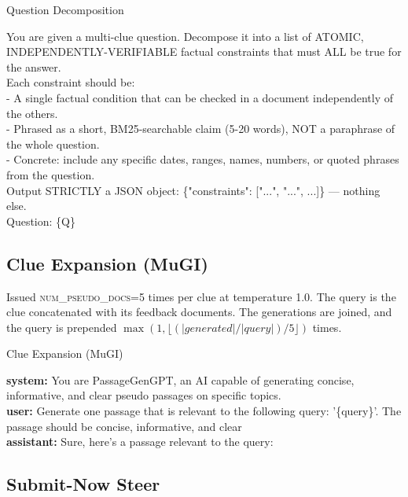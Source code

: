 \begin{promptbox}{Question Decomposition}
\ttfamily\footnotesize\raggedright
You are given a multi-clue question. Decompose it into a list of ATOMIC, INDEPENDENTLY-VERIFIABLE factual constraints that must ALL be true for the answer.
\\[4pt]
Each constraint should be:
\\
- A single factual condition that can be checked in a document independently of the others.
\\
- Phrased as a short, BM25-searchable claim (5-20 words), NOT a paraphrase of the whole question.
\\
- Concrete: include any specific dates, ranges, names, numbers, or quoted phrases from the question.
\\[4pt]
Output STRICTLY a JSON object: \{"constraints": ["...", "...", ...]\} --- nothing else.
\\[4pt]
Question: \{Q\}
\end{promptbox}


\subsection{Clue Expansion (MuGI)}

Issued \textsc{num\_pseudo\_docs}=5 times per clue at temperature 1.0. The query is the clue
concatenated with its feedback documents. The generations are joined, and the query is
prepended $\max(1, \lfloor(|generated|/|query|)/5\rfloor)$ times.

\begin{promptbox}{Clue Expansion (MuGI)}
\ttfamily\footnotesize\raggedright
\textbf{system:} You are PassageGenGPT, an AI capable of generating concise, informative, and clear pseudo passages on specific topics.
\\[4pt]
\textbf{user:} Generate one passage that is relevant to the following query: '\{query\}'. The passage should be concise, informative, and clear
\\[4pt]
\textbf{assistant:} Sure, here's a passage relevant to the query:
\end{promptbox}

\subsection{Submit-Now Steer}

